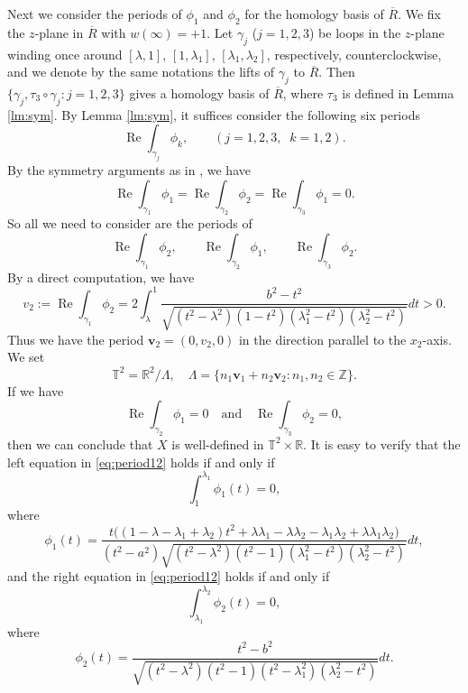 \documentclass[11pt]{amsart}
\renewcommand{\Re}{\operatorname{Re}}
\numberwithin{equation}{section}
\numberwithin{figure}{section}
\theoremstyle{plain} %
\theoremstyle{definition} %
\begin{document}
Next we consider the periods of $\phi_1$ and $\phi_2$ for the homology basis of $\overline{R}$. 
We fix the $z$-plane in $\overline{R}$ with $w(\infty)=+1$. 
Let $\gamma_j$ ($j=1,2,3$) be loops in the $z$-plane winding once 
around $[\lambda,1]$, $[1,\lambda_1]$, $[\lambda_1,\lambda_2]$, respectively, 
counterclockwise, 
and we denote by the same notations the lifts of $\gamma_j$ to $\overline{R}$. 
Then $\{\gamma_j,\tau_3\circ\gamma_j:j=1,2,3\}$ gives a homology basis of $\overline{R}$, where $\tau_3$ is defined in Lemma \ref{lm:sym}. 
By Lemma \ref{lm:sym}, it suffices consider the following six periods
\[
\Re\int_{\gamma_j}\phi_k,\qquad
(j=1,2,3,\;\;k=1,2).
\]
By the symmetry arguments as in \cite[Proof of Lemma 3.2]{wei2}, we have 
\[
\Re\int_{\gamma_1}\phi_1=
\Re\int_{\gamma_2}\phi_2=
\Re\int_{\gamma_3}\phi_1=0.
\]
So all we need to consider are the periods of 
\[
\Re\int_{\gamma_1}\phi_2,\qquad
\Re\int_{\gamma_2}\phi_1,\qquad
\Re\int_{\gamma_3}\phi_2.
\]
By a direct computation, we have 
\[
v_2:=\Re\int_{\gamma_1}\phi_2
=2\int_{\lambda}^1\frac{b^2-t^2}{\sqrt{(t^2-\lambda^2)(1-t^2)(\lambda_1^2-t^2)(\lambda_2^2-t^2)}}dt>0. 
\]
Thus we have the period $\bm{v}_2=(0,v_2,0)$ in the direction parallel to the $x_2$-axis. 
We set 
\begin{equation}\label{eq:torus}
\mathbb{T}^2=\mathbb{R}^2/\Lambda, 
\quad
\Lambda=\{n_1\bm{v}_1+n_2\bm{v}_2:n_1,n_2\in\mathbb{Z}\}. 
\end{equation}
If we have
\begin{equation}\label{eq:period12}
\Re\int_{\gamma_2}\phi_1=0
\quad\text{and}\quad
\Re\int_{\gamma_3}\phi_2=0,
\end{equation}
then we can conclude that $X$ is well-defined in $\mathbb{T}^2\times\mathbb{R}$. 
It is easy to verify that the left equation in \eqref{eq:period12} holds if and only if
\begin{equation}\label{eq:period1}
\int_1^{\lambda_1}\phi_1(t)=0, 
\end{equation}
where 
\[
\phi_1(t)=\frac{t\big((1-\lambda-\lambda_1+\lambda_2)t^2
+\lambda\lambda_1-\lambda\lambda_2-\lambda_1\lambda_2+\lambda\lambda_1\lambda_2\big)}
{(t^2-a^2)\sqrt{(t^2-\lambda^2)(t^2-1)(\lambda_1^2-t^2)(\lambda_2^2-t^2)}}dt,
\]
and the right equation in \eqref{eq:period12} holds if and only if
\begin{equation}\label{eq:period2}
\int_{\lambda_1}^{\lambda_2}\phi_2(t)=0,
\end{equation}
where 
\[
\phi_2(t)=\frac{t^2-b^2}{\sqrt{(t^2-\lambda^2)(t^2-1)(t^2-\lambda_1^2)(\lambda_2^2-t^2)}}dt.
\] 
\end{document}
